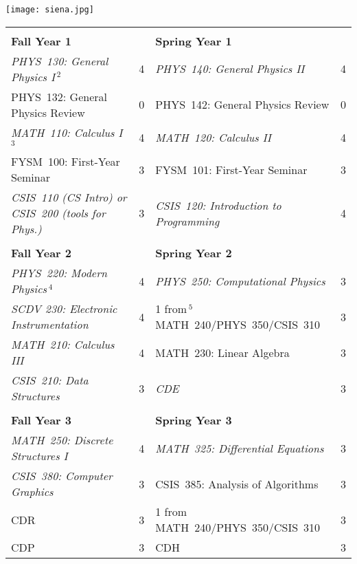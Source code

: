 \documentclass[12pt]{article}
\begin{document}
\hfill 

\texttt{[image: siena.jpg]}

\vspace{0.1cm}
\vspace{0.3cm}

\vspace*{-5mm}
\begin{table}[h!]
\begin{center}
{\renewcommand{\arraystretch}{1.2}
\begin{tabular*}{0.9\textwidth}{@{\extracolsep{\fill}}lclc}
 & \\
{\Large \textbf{Fall Year 1}} & & {\Large \textbf{Spring Year 1}} & \\
\hline
{\em PHYS~130: General Physics I}\,$^{2}$  & 4 & {\em PHYS~140: General Physics II}     & 4 \\
PHYS~132: General Physics Review           & 0 & PHYS~142: General Physics Review & 0\\
{\em MATH~110: Calculus I}\,$^{3}$         & 4 & {\em MATH~120: Calculus II}            & 4 \\
FYSM~100: First-Year Seminar               & 3 & FYSM~101: First-Year Seminar     & 3\\
{\em CSIS~110 (CS Intro) or CSIS~200 (tools for Phys.)}    & 3 & 
{\em CSIS~120: Introduction to Programming}  & 4 \\

 & \\
{\Large \textbf{Fall Year 2}} & & {\Large \textbf{Spring Year 2}} & \\
\hline
{\em PHYS~220: Modern Physics}\,$^{4}$      & 4 & 
{\em PHYS~250: Computational Physics}      & 3 \\
{\em SCDV 230: Electronic Instrumentation} & 4 &
1 from\,$^{5}$ MATH~240/PHYS~350/CSIS~310                & 3  \\
{\em MATH~210: Calculus III}               & 4 & MATH~230: Linear Algebra & 3 \\
{\em CSIS~210: Data Structures}    & 3 & 
{\em CDE} & 3 \\


 & \\
 
{\Large \textbf{Fall Year 3}} & & {\Large \textbf{Spring Year 3}} & \\
\hline
{\em MATH~250: Discrete Structures I}       & 4 & {\em MATH~325: Differential Equations} 			& 3  \\
{\em CSIS~380: Computer Graphics} 	            & 3 & CSIS~385: Analysis of Algorithms 	& 3 \\
CDR								& 3 &1 from MATH~240/PHYS~350/CSIS~310     				& 3 \\
CDP  									& 3 & CDH											&3  \\


\end{tabular*}}
\end{center}
\end{table}
\end{document}
